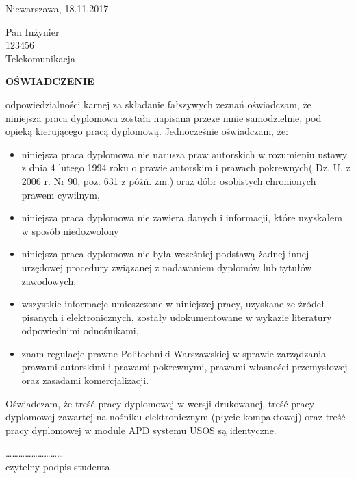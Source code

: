 \begin{flushright}
    Niewarszawa, 18.11.2017\\
\end{flushright}

\begin{flushleft}
    Pan Inżynier \\
    123456 \\
    Telekomunikacja \\
\end{flushleft}
\vspace{1cm}

\begin{center}
    \textbf{OŚWIADCZENIE}
\end{center}
\vspace{1cm}

 odpowiedzialności karnej za składanie fałszywych zeznań oświadczam, że niniejsza praca dyplomowa została
napisana przeze mnie samodzielnie, pod opieką kierującego pracą dyplomową.
Jednocześnie oświadczam, że:
\begin{itemize}
   \item niniejsza praca dyplomowa nie narusza praw autorskich w rozumieniu ustawy z dnia 4 lutego 1994 roku o prawie autorskim i
   prawach pokrewnych( Dz, U. z 2006 r. Nr 90, poz. 631 z późń. zm.) oraz dóbr osobistych chronionych prawem cywilnym,
   \item niniejsza praca dyplomowa nie zawiera danych i informacji, które uzyskałem w sposób niedozwolony
   \item niniejsza praca dyplomowa nie była wcześniej podstawą żadnej innej urzędowej procedury związanej z nadawaniem dyplomów
   lub tytułów zawodowych,
   \item wszystkie informacje umieszczone w niniejszej pracy, uzyskane ze źródeł pisanych i elektronicznych, zostały
   udokumentowane w wykazie literatury odpowiednimi odnośnikami,
   \item znam regulacje prawne Politechniki Warszawskiej w sprawie zarządzania prawami autorskimi i prawami pokrewnymi,
   prawami własności przemysłowej oraz zasadami komercjalizacji.
\end{itemize}
Oświadczam, że treść pracy dyplomowej w wersji drukowanej, treść pracy dyplomowej zawartej na nośniku elektronicznym
(płycie kompaktowej) oraz treść pracy dyplomowej w module APD systemu USOS są identyczne.
\vspace{1.5cm}

\begin{flushright}
    \dots\dots\dots\dots\dots\dots\dots\dots\dots\\
    czytelny podpis studenta
\end{flushright}
